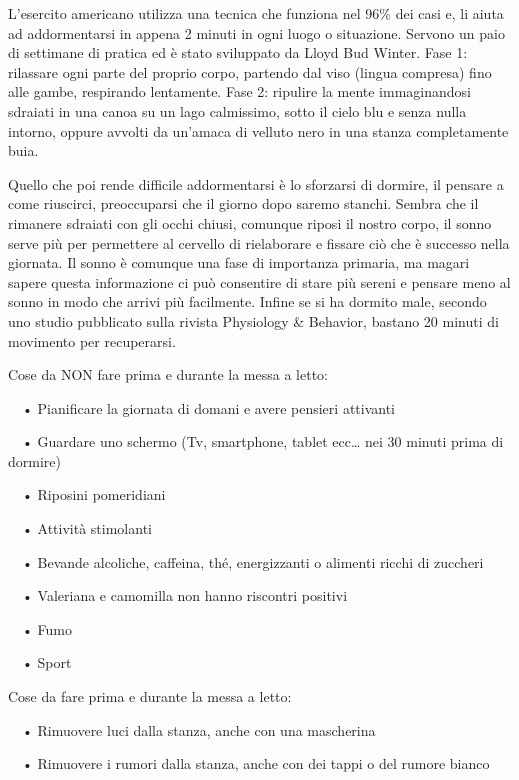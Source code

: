 \documentclass[12pt]{book} %
\begin{document}
\begin{mdframed}[linewidth=1pt]
L'esercito americano utilizza una tecnica che funziona nel 96\% dei casi e, li aiuta ad
addormentarsi in appena 2 minuti in ogni luogo o situazione. Servono un paio di settimane di pratica ed è stato
sviluppato da Lloyd {\textquotedbl}Bud{\textquotedbl} Winter. Fase 1: rilassare ogni parte del proprio corpo, partendo
dal viso (lingua compresa) fino alle gambe, respirando lentamente. Fase 2: ripulire la mente immaginandosi sdraiati in
una canoa su un lago calmissimo, sotto il cielo blu e senza nulla intorno, oppure avvolti da un'amaca di velluto nero
in una stanza completamente buia.

Quello che poi rende difficile addormentarsi è lo sforzarsi di dormire, il pensare a come riuscirci, preoccuparsi che il giorno dopo saremo stanchi. Sembra che il rimanere sdraiati con gli occhi chiusi, comunque riposi il nostro corpo, il sonno serve più per permettere al cervello di rielaborare e fissare ciò che è successo nella giornata. Il sonno è comunque una fase di importanza primaria, ma magari sapere questa informazione ci può consentire di stare più sereni e pensare meno al sonno in modo che arrivi più facilmente. 
Infine se si ha dormito male, secondo uno studio pubblicato sulla rivista Physiology \& Behavior, bastano 20 minuti di movimento per recuperarsi.

Cose da NON fare prima e durante la messa a letto:

\ \ • Pianificare la giornata di domani e avere pensieri attivanti

\ \ • Guardare uno schermo (Tv, smartphone, tablet ecc… nei 30 minuti prima di dormire)

\ \ • Riposini pomeridiani

\ \ • Attività stimolanti

\ \ • Bevande alcoliche, caffeina, thé, energizzanti o alimenti ricchi di zuccheri

\ \ • Valeriana e camomilla non hanno riscontri positivi 

\ \ • Fumo

\ \ • Sport


\bigskip

Cose da fare prima e durante la messa a letto:

\ \ • Rimuovere luci dalla stanza, anche con una mascherina

\ \ • Rimuovere i rumori dalla stanza, anche con dei tappi o del rumore bianco


\end{mdframed}
\end{document}
